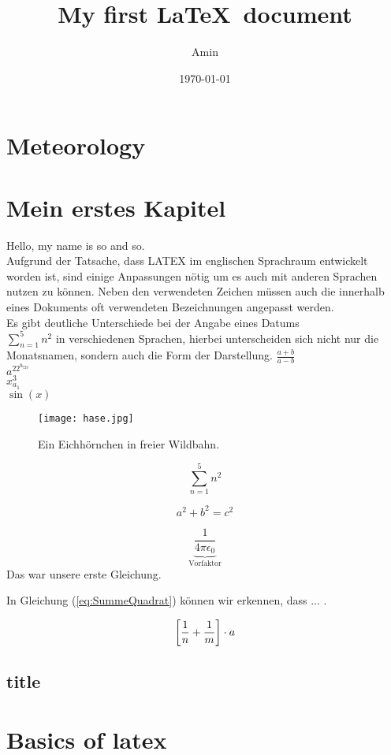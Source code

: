 \documentclass{article}
\title{My first \LaTeX\ document}
\author{Amin}
\date{\today}
\begin{document}
	\maketitle
	\tableofcontents
	\section{Meteorology}
	\section{Mein erstes Kapitel}
	Hello, my name is so and so.\\
	Aufgrund der Tatsache, dass LATEX im englischen Sprachraum entwickelt worden ist, sind einige Anpassungen nötig um es auch mit anderen Sprachen nutzen zu können. Neben den verwendeten Zeichen müssen auch die innerhalb eines Dokuments oft verwendeten Bezeichnungen angepasst werden.\\
	Es gibt deutliche Unterschiede bei der Angabe eines Datums\\$\sum\limits_{n = 1}^{5}n^2$ in verschiedenen Sprachen, hierbei unterscheiden sich nicht nur die Monatsnamen, sondern auch die Form der Darstellung.
	$\frac{a + b}{a - b}$\\
	$a^{22^{b_{723}}}$\\
	$x_{a_1}^3$\\
	$\sin(x)$\\
	
	\begin{figure}
		\centering
		
		\texttt{[image: hase.jpg]}
		\caption{Ein Eichhörnchen in freier Wildbahn.}
		\label{fig:eichhoernchen}
	\end{figure}
	
	\begin{equation}
		\sum\limits_{n = 1}^5 n^2 \label{eq:SummeQuadrat}
	\end{equation}
	
	
	\begin{equation}
		a^2 + b^2 = c^2
	\end{equation}

	\begin{equation}
		\underbrace{\frac{1}{4\pi\epsilon_0}}_{\text{Vorfaktor}}
	\end{equation}
	Das war unsere erste Gleichung.
	

In Gleichung (\ref{eq:SummeQuadrat}) können wir erkennen, dass ... .

\begin{equation}
	\left[\frac{1}{n}+\frac{1}{m}\right]\cdot a
\end{equation}

	\subsection{title}

	
	\section{Basics of latex}
	
\end{document}
